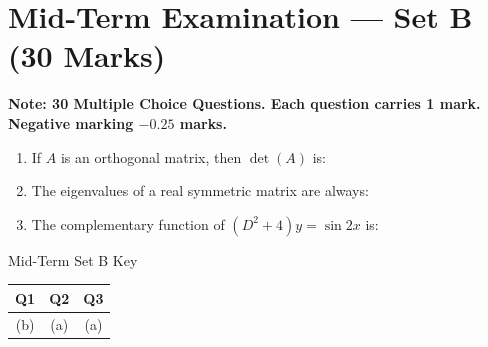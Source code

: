 \section{Mid-Term Examination --- Set B (30 Marks)}
\label{sec:midterm_set_b}


\begin{center}
\sffamily\textbf{\color{AlertRed}Note: 30 Multiple Choice Questions. Each question carries 1 mark. Negative marking $-0.25$ marks.}
\end{center}

\begin{enumerate}[label=\textbf{\arabic*.}]
    \item If $A$ is an orthogonal matrix, then $\det(A)$ is:
    \item The eigenvalues of a real symmetric matrix are always:
    \item The complementary function of $(D^2 + 4)y = \sin 2x$ is:
\end{enumerate}

\begin{answerkeytable}{Mid-Term Set B Key}
\begin{tabular}{|c|c|c|}
\hline
\textbf{Q1} & \textbf{Q2} & \textbf{Q3} \\
\hline
(b) & (a) & (a) \\
\hline
\end{tabular}
\end{answerkeytable}

\newpage
